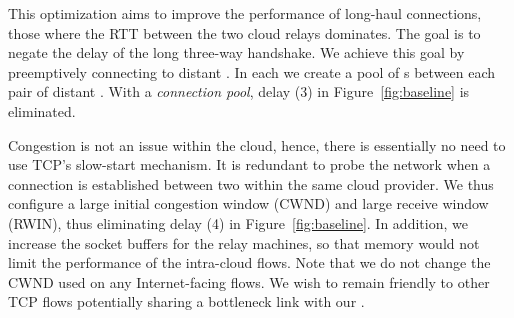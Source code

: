  This optimization aims to improve the performance of long-haul connections, \ie those where the RTT between the two cloud relays dominates. The goal is to negate the delay of the long three-way handshake. We achieve this goal by preemptively connecting to distant \relays. In each \relay we create a pool of {\reconn}s between each pair of distant \relays.
With a \textit{connection pool}, delay (3) in Figure~\ref{fig:baseline} is eliminated.

Congestion is not an issue within the cloud, hence, there is essentially no need to use TCP's slow-start mechanism. It is redundant to probe the network when a connection is established between two \relays within the same cloud provider. We thus configure a large initial congestion window (CWND) and large receive window (RWIN), thus eliminating delay (4) in Figure~\ref{fig:baseline}. In addition, we increase the socket buffers for the relay machines, so that memory would not limit the performance of the intra-cloud flows.
Note that we do not change the CWND used on any Internet-facing flows. We wish to remain friendly to other TCP flows potentially sharing a bottleneck link with our \relays.